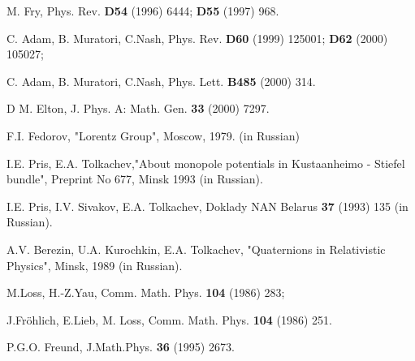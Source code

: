 \documentclass[12pt,a4paper]{article}
\begin{document}
\begin{thebibliography}{999}

  M. Fry, Phys. Rev. {\bf D54} (1996) 6444;
{\bf D55} (1997) 968.

 C. Adam, B. Muratori, C.Nash, Phys. Rev. {\bf D60} (1999)
125001; {\bf D62} (2000) 105027;

C. Adam, B. Muratori, C.Nash, Phys. Lett. {\bf B485} (2000) 314.

 D M. Elton, J. Phys. A: Math. Gen. {\bf 33} (2000) 7297.

 F.I. Fedorov, "Lorentz Group", Moscow, 1979. (in Russian)

 I.E. Pris, E.A. Tolkachev,"About monopole potentials in
Kustaanheimo - Stiefel bundle", Preprint No 677, Minsk 1993 (in Russian).

 I.E. Pris, I.V. Sivakov, E.A. Tolkachev, Doklady  NAN
Belarus {\bf 37} (1993) 135 (in Russian).

 A.V. Berezin, U.A. Kurochkin, E.A. Tolkachev, "Quaternions in
Relativistic Physics", Minsk, 1989 (in Russian).

 M.Loss, H.-Z.Yau, Comm. Math. Phys. {\bf 104} (1986) 283;

J.Fr\"ohlich, E.Lieb, M. Loss, Comm. Math. Phys. {\bf 104} (1986) 251.

 P.G.O. Freund, J.Math.Phys. {\bf 36}  (1995) 2673.
\end{thebibliography}
\end{document}
